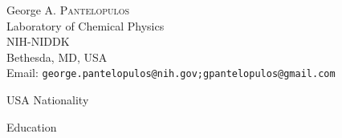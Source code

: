 \documentclass[a4paper]{article}
\begin{document}
\noindent\hspace*{\tabcolsep}\begin{minipage}{0.4\linewidth}
{\large George A. \textsc{Pantelopulos}}\\
Laboratory of Chemical Physics\\
NIH-NIDDK\\
Bethesda, MD, USA\\[3pt]
Email: \texttt{george.pantelopulos@nih.gov;gpantelopulos@gmail.com}
\end{minipage}
\begin{minipage}{0.4\linewidth}
USA Nationality\\
\end{minipage}

\begin{rubrique}{Education}
\begin{sousrubrique}
\end{sousrubrique}

\begin{sousrubrique}
\end{sousrubrique}

\begin{sousrubrique}
\end{sousrubrique}
\end{rubrique}
\end{document}
